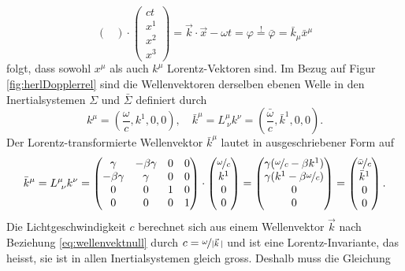 \documentclass[a4paper,12pt]{article}
\numberwithin{equation}{section}
\begin{document}
\begin{equation}
\begin{pmatrix}
\end{pmatrix}\cdot \begin{pmatrix}
c t  \\ x^1 \\ x^2 \\ x^3
\end{pmatrix} = \vec{k}\cdot \vec{x} -\omega t = \varphi \overset{!}{=} \bar{\varphi} = \bar{k}_\mu \bar{x}^\mu
\end{equation} folgt, dass sowohl $x^\mu$ als auch $k^\mu$ Lorentz-Vektoren sind. Im Bezug auf Figur \ref{fig:herlDopplerrel} sind die Wellenvektoren derselben ebenen Welle in den Inertialsystemen $\Sigma$ und $\bar{\Sigma}$ definiert durch \begin{equation}
k^{\mu } =\left(\frac{\omega }{c} ,k^{1} ,0,0\right), \quad \bar{k}^{\mu } = L^\mu_{\ \nu} k^\nu = \left(\frac{\bar{\omega }}{c} ,\bar{k}^{1} ,0,0\right).
\end{equation} Der Lorentz-transformierte Wellenvektor $\bar{k}^\mu$ lautet in ausgeschriebener Form auf \begin{equation}\label{eq:HerlDopplerGrundGlMatrix}
\bar{k}^\mu = L^\mu_{\ \nu}k^\nu = \begin{pmatrix}
\gamma & -\beta\gamma & 0 & 0 \\
-\beta\gamma & \gamma & 0 & 0 \\
0 & 0 & 1 & 0 \\
0 & 0 & 0 & 1
\end{pmatrix}\cdot \begin{pmatrix}
\nicefrac{\omega}{c} \\ k^1 \\ 0 \\ 0
\end{pmatrix}  = \begin{pmatrix}
\gamma (\nicefrac{\omega}{c}-\beta k^1) \\ \gamma (k^1-\beta\nicefrac{\omega}{c}) \\ 0 \\ 0
\end{pmatrix} = \begin{pmatrix}
\nicefrac{\bar{\omega}}{c} \\ \bar{k}^1 \\ 0 \\ 0
\end{pmatrix}.
\end{equation} Die Lichtgeschwindigkeit $c$ berechnet sich aus einem Wellenvektor $\vec{k}$ nach Beziehung \eqref{eq:wellenvektnull} durch $c = \nicefrac{\omega}{|\vec{k}\,|}$ und ist eine Lorentz-Invariante, das heisst, sie ist in allen Inertialsystemen gleich gross. Deshalb muss die Gleichung \begin{equation}\label{eq:HerlDopplerGrundGlEben}

\end{equation}
\end{document}
